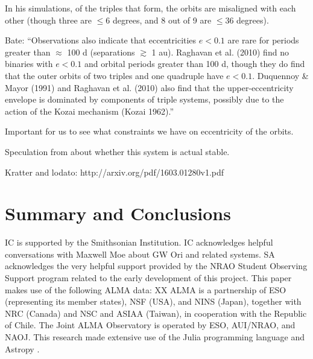 \documentclass{aastex6}
\begin{document}
In his simulations, of the triples that form, the orbits are misaligned with each other (though three are $\leq 6$ degrees, and 8 out of 9 are $\leq 36$ degrees).

Bate:  ``Observations also indicate that eccentricities $e < 0.1$ are rare for periods greater than $\approx$ 100 d (separations $\gtrsim$ 1 au). Raghavan et al. (2010) find no binaries with $e < 0.1$ and orbital periods greater than 100 d, though they do find that the outer orbits of two triples and one quadruple have $e < 0.1$. Duquennoy \& Mayor (1991) and Raghavan et al. (2010) also find that the upper-eccentricity envelope is dominated by components of triple systems, possibly due to the action of the Kozai mechanism (Kozai 1962).''

Important for us to see what constraints we have on eccentricity of the orbits.

Speculation from \citet{berger11} about whether this system is actual stable.

Kratter and lodato: http://arxiv.org/pdf/1603.01280v1.pdf

\section{Summary and Conclusions} \label{sec:summary}

\acknowledgments
IC is supported by the Smithsonian Institution. IC acknowledges helpful conversations with Maxwell Moe about GW Ori and related systems.  SA acknowledges the very helpful support provided by the NRAO Student Observing Support program related to the early development of this project.  This paper makes use of the following ALMA data: XX  ALMA is a partnership of ESO (representing its member states), NSF (USA), and NINS (Japan), together with NRC (Canada) and NSC and ASIAA (Taiwan), in cooperation with the Republic of Chile.  The Joint ALMA Observatory is operated by ESO, AUI/NRAO, and NAOJ.  This research made extensive use of the Julia programming language \citep{julia12} and Astropy \citep{astropy13}.



\end{document}
